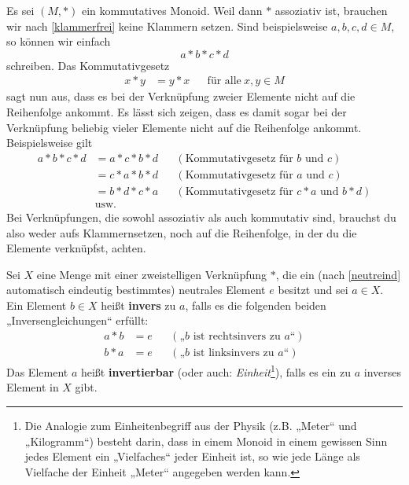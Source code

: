 \begin{bem} \label{reihenfolgeegal}
    Es sei $(M,*)$ ein kommutatives Monoid. Weil dann $*$ assoziativ ist, brauchen wir nach \cref{klammerfrei} keine Klammern setzen. Sind beispielsweise $a,b,c,d\in M$, so können wir einfach
        \[ a*b*c*d \]
    schreiben. Das Kommutativgesetz
    \begin{align*}
        x*y&=y*x && \text{für alle}\ x,y\in M
    \end{align*}
    sagt nun aus, dass es bei der Verknüpfung zweier Elemente nicht auf die Reihenfolge ankommt. Es lässt sich zeigen, dass es damit sogar bei der Verknüpfung beliebig vieler Elemente nicht auf die Reihenfolge ankommt. Beispielsweise gilt
    \begin{align*}
        a*b*c*d & = a*c*b*d && (\text{Kommutativgesetz für $b$ und $c$}) \\
        & = c*a*b*d && (\text{Kommutativgesetz für $a$ und $c$}) \\
        & = b*d*c*a && (\text{Kommutativgesetz für $c*a$ und $b*d$}) \\
        & \text{usw.}
    \end{align*}
    Bei Verknüpfungen, die sowohl assoziativ als auch kommutativ sind, brauchst du also weder aufs Klammernsetzen, noch auf die Reihenfolge, in der du die Elemente verknüpfst, achten.
\end{bem}


\begin{de} \label{def:inverse}  
    Sei $X$ eine Menge mit einer zweistelligen Verknüpfung $*$, die ein (nach \cref{neutreind} automatisch eindeutig bestimmtes) neutrales Element $e$ besitzt und sei $a\in X$. Ein Element $b\in X$ heißt \textbf{invers} zu $a$, falls es die folgenden beiden „Inversengleichungen“ erfüllt:
    \begin{align*}
        a*b & = e && (\text{„$b$ ist rechtsinvers zu $a$“}) \\
        b*a & = e && (\text{„$b$ ist linksinvers zu $a$“})
    \end{align*}
    Das Element $a$ heißt \textbf{invertierbar} (oder auch: \emph{Einheit}\footnote{Die Analogie zum Einheitenbegriff aus der Physik (z.B. „Meter“ und „Kilogramm“) besteht darin, dass in einem Monoid in einem gewissen Sinn jedes Element ein „Vielfaches“ jeder Einheit ist, so wie jede Länge als Vielfache der Einheit „Meter“ angegeben werden kann.}), falls es ein zu $a$ inverses Element in $X$ gibt.
\end{de}


